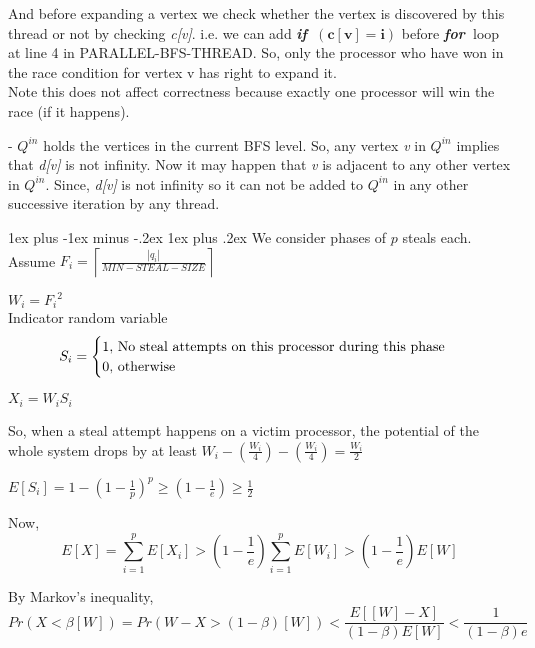 \documentclass[11pt]{article}
\makeatletter
\renewcommand{\subsection}{\@startsection{subsection}{2}{0mm}%
                                     {1ex plus -1ex minus -.2ex}%
                                     {1ex plus .2ex}%
                                     {\normalfont\large\bfseries}}%
\newcommand{\ceil}[1]{\ensuremath{\left\lceil#1\right\rceil}}
\newcommand{\xif}{{\bf{\em{if~}}}}
\newcommand{\xfor}{{\bf{\em{for~}}}}
\makeatother
\begin{document}
And before expanding a vertex we check whether the vertex is discovered by this thread or not by checking {\it c[v]}. i.e. we can add \xif $\mathbf{(c[v] = i)}$ before \xfor loop at line 4 in PARALLEL-BFS-THREAD. So, only the processor who have won in the race condition for vertex v has right to expand it.\\  Note this does not affect correctness because exactly one processor will win the race (if it happens).

- $Q^{in}$ holds the vertices in the current BFS level. So, any vertex {\it v} in $Q^{in}$ implies that {\it d[v]} is not infinity. Now it may happen that {\it v} is adjacent to any other vertex in $Q^{in}$. Since, {\it d[v]} is not infinity so it can not be added to $Q^{in}$ in any other successive iteration by any thread.      

\subsection{}
We consider phases of $p$ steals each.
Assume $F_i = \ceil {\frac {|q_i|}{MIN-STEAL-SIZE}}$

$W_i = {F_i}^2$\\
Indicator random variable \[
S_i = \begin{cases}
1 , $ No steal attempts on this processor during this phase$\\
0 , $  otherwise$
\end{cases}
\]

$X_i = W_i S_i$

So, when a steal attempt happens on a victim processor, the potential of the whole system drops by at least
$W_i - (\frac{W_i}{4}) - (\frac{W_i}{4}) = \frac{W_i}{2}$

$E[S_i] = 1 - {(1-\frac{1}{p})}^p \geq (1-\frac{1}{e}) \geq \frac{1}{2}$

Now, \[
E \left[ X \right] = \sum \limits_{i=1}^p E \left[ X_i \right] > \left( 1 - \frac{1}{e} \right) \sum \limits_{i=1}^p E[W_i] >\left( 1 - \frac{1}{e} \right) E \left [W \right ]
\]

By Markov's inequality,\\
\[Pr \left( X < \beta [W] \right) = Pr \left( W - X > (1 - \beta)[W] \right) < \frac {E \left[ [W] - X \right]}{\left(1 - \beta \right)  E[W]} < \frac {1}{\left(1 - \beta \right) e }
\] \\\\\\\\
\end{document}
